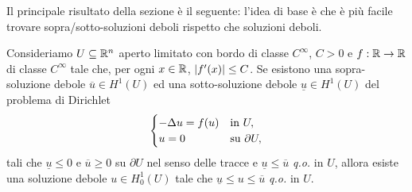 Il principale risultato della sezione è il seguente: l'idea di base è che è più facile trovare sopra/sotto-soluzioni deboli rispetto che soluzioni deboli.
\begin{teorema}\label{metodosubsuper}
Consideriamo $U\subseteq \mathbb{R}^n$ aperto limitato con bordo di classe $C^\infty$, $C >0$ e $f: \mathbb{R} \to \mathbb{R}$ di classe $C^\infty$ tale che, per ogni $ x\in \mathbb{R}$, $\lvert f'(x)\rvert\le C$. Se esistono una sopra-soluzione debole $\overline{u} \in H^1(U)$ ed una sotto-soluzione debole $\underline{u} \in H^1(U)$ del problema di Dirichlet
\[ 	\begin{cases}
	-\Delta u = f(u) & \textup{in } U,\\
	u = 0 & \textup{su } \partial U,
\end{cases} \]
 tali che $\underline{u} \le 0$ e $\overline{u} \ge 0$ su $\partial U$ nel senso delle tracce e $\underline{u} \le \overline{u}$ \emph{q.o.} in $U$, allora esiste una soluzione debole $u \in H^1_0(U)$ tale che $\underline{u} \le u \le \overline{u}$ \emph{q.o.} in $U$.
\end{teorema}
